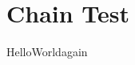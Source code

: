 \documentclass{article}
\def\base{Hello}
\def\stepone{\base World}
\def\steptwo{\stepone again}
\begin{document}
\section{Chain Test}
\steptwo
\end{document}
